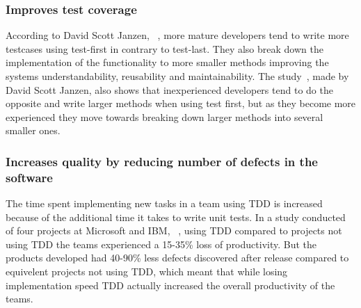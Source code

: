 \subsubsection*{Improves test coverage}
According to David Scott Janzen, ~\cite{janzen}, more mature developers tend to write more testcases using test-first in contrary to test-last. They also break down the implementation of the functionality to more smaller methods improving the systems understandability, reusability and maintainability. The study~\cite{janzen}, made by David Scott Janzen, also shows that inexperienced developers tend to do the opposite and write larger methods when using test first, but as they become more experienced they move towards breaking down larger methods into several smaller ones.

\subsubsection*{Increases quality by reducing number of defects in the software}
The time spent implementing new tasks in a team using TDD is increased because of the additional time it takes to write unit tests. In a study conducted of four projects at Microsoft and IBM, ~\cite{microsoftibm}, using TDD compared to projects not using TDD the teams experienced a 15-35\% loss of productivity. But the products developed had 40-90\% less defects discovered after release compared to equivelent projects not using TDD, which meant that while losing implementation speed TDD actually increased the overall productivity of the teams. 
  
%
%




